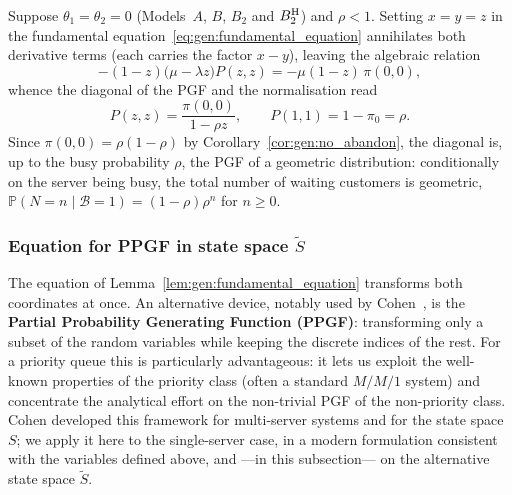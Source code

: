 \begin{corollary}\label{cor:gen:diagonal}
    Suppose $\theta_1=\theta_2=0$ (Models~$A$, $B$, $B_2$ and $B_2^{\mathrm{H}}$) and $\rho<1$. Setting $x=y=z$ in the fundamental equation~\eqref{eq:gen:fundamental_equation} annihilates both derivative terms (each carries the factor $x-y$), leaving the algebraic relation
    \begin{equation*}
        -(1-z)\bigl(\mu-\lambda z\bigr)P(z,z)=-\mu(1-z)\,\pi(0,0),
    \end{equation*}
    whence the diagonal of the PGF and the normalisation read
    \begin{equation}
        P(z,z)=\frac{\pi(0,0)}{1-\rho z}, \qquad P(1,1)=1-\pi_0=\rho.
        \label{eq:gen:Pzz_diag}
    \end{equation}
    Since $\pi(0,0)=\rho(1-\rho)$ by Corollary~\ref{cor:gen:no_abandon}, the diagonal is, up to the busy probability $\rho$, the PGF of a geometric distribution: conditionally on the server being busy, the total number of waiting customers is geometric, $\mathbb{P}(N=n \mid \mathcal{B}=1)=(1-\rho)\rho^{n}$ for $n\ge0$.
\end{corollary}


\subsubsection{Equation for PPGF in state space \texorpdfstring{$\widetilde{S}$}{S~}}

The equation of Lemma~\ref{lem:gen:fundamental_equation} transforms both coordinates at once. An alternative device, notably used by Cohen~\cite{cohen1956delay}, is the \textbf{Partial Probability Generating Function (PPGF)}: transforming only a subset of the random variables while keeping the discrete indices of the rest. For a priority queue this is particularly advantageous: it lets us exploit the well-known properties of the priority class (often a standard $M/M/1$ system) and concentrate the analytical effort on the non-trivial PGF of the non-priority class. Cohen developed this framework for multi-server systems and for the state space $S$; we apply it here to the single-server case, in a modern formulation consistent with the variables defined above, and ---in this subsection--- on the alternative state space $\widetilde{S}$.


